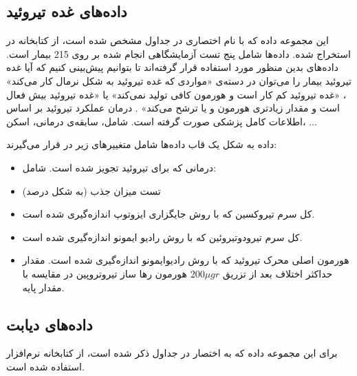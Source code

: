 \subsection{
داده‌های غده تیروئید
}

این مجموعه داده که با نام اختصاری 
در جداول مشخص شده است، از کتابخانه
\cite{rmclust}
در 
استخراج شده. داده‌ها شامل پنج تست آزمایشگاهی انجام شده بر روی 215 بیمار است. داده‌های بدین منظور مورد استفاده قرار گرفته‌اند تا بتوانیم پیش‌بینی کنیم که آیا غده تیروئید بیمار را می‌توان در دسته‌ی «مواردی که غده تیروئید به شکل نرمال کار می‌کند»
، «غده تیروئید کم کار است و هورمون کافی تولید نمی‌کند»
یا «غده تیروئید بیش فعال است و مقدار زیادتری هورمون 
و یا
ترشح می‌کند»
. درمان عملکرد تیروئید بر اساس اطلاعات کامل پزشکی صورت گرفته است. شامل، سابقه‌ی درمانی، اسکن، ...

داده به شکل یک قاب دا‌ده‌ها
شامل متغییر‌های زیر در 
قرار می‌گیرند:
\begin{itemize}
\item
{}
درمانی که برای تیروئید تجویز شده است. شامل:
\item
{}
تست میزان جذب 
(به شکل درصد)
\item
{}
کل سرم تیروکسین که با روش جایگزاری ایزوتوپ
اندازه‌گیری شده است.
\item
{}
کل سرم تیرودوتیروئین 
که با روش رادیو ایمونو
اندازه‌گیری شده است.
\item
{}
هورمون اصلی محرک تیروئید که با روش رادیوایمونو اندازه‌گیری شده است.
مقدار حداکثر اختلاف
بعد از تزریق
$200 \mu gr$
هورمون رها ساز تیروتروپین
در مقایسه با مقدار پایه.
\end{itemize}


\subsection{
داده‌های دیابت
}

برای این مجموعه داده که به اختصار 
در جداول ذکر شده است، از کتابخانه
\cite{rmclust}
نرم‌افزار 
استفاده شده است.

